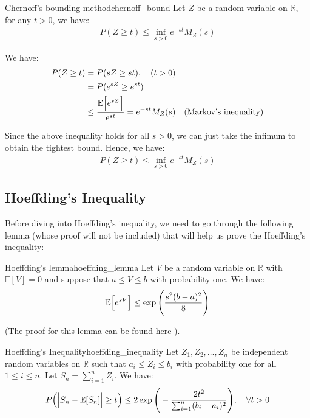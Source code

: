\begin{corollary}{Chernoff's bounding method}{chernoff_bound}
    Let $Z$ be a random variable on $\mathbb{R}$, for any $t>0$, we have:
    \begin{align*}
        P(Z\ge t) \le \inf_{s>0} e^{-st}M_Z(s)
    \end{align*}
\end{corollary}

\begin{proof*}
    We have:
    \begin{align*}
        P(Z \ge t) &= P(sZ \ge st), \ \ \ (t > 0) \\
            &= P(e^{sZ} \ge e^{st}) \\
            &\le \frac{\mathbb{E}\Big[ e^{sZ} \Big]}{e^{st}} = e^{-st}M_Z(s) \ \ \ (\text{Markov's inequality})
    \end{align*}

    \noindent Since the above inequality holds for all $s>0$, we can just take the infimum to obtain the tightest bound. Hence, we have:
    \begin{align*}
        P(Z \ge t) \le \inf_{s>0}e^{-st}M_Z(s)
    \end{align*}
\end{proof*}

\subsection{Hoeffding's Inequality}
Before diving into Hoeffding's inequality, we need to go through the following lemma (whose proof will not be included) that will help us prove the Hoeffding's inequality:
\begin{lemma}{Hoeffding's lemma}{hoeffding_lemma}
    Let $V$ be a random variable on $\mathbb{R}$ with $\mathbb{E}[V]=0$ and suppose that $a\le V \le b$ with probability one. We have:
    \begin{align*}
        \mathbb{E}\Big[ e^{sV} \Big] \le \exp\Bigg( 
        \frac{s^2(b-a)^2}{8}
         \Bigg)
    \end{align*}
\end{lemma}
\begin{proof*}
    (The proof for this lemma can be found here \cite{wiki:hoeffding_lemma}).
\end{proof*}

\begin{theorem}{Hoeffding's Inequality}{hoeffding_inequality}
    Let $Z_1, Z_2, \dots, Z_n$ be independent random variables on $\mathbb{R}$ such that $a_i \le Z_i \le b_i$ with probability one for all $1\le i \le n$. Let $S_n = \sum_{i=1}^n Z_i$. We have:
    \begin{align*}
        P\Big(  \Big|  S_n - \mathbb{E}[S_n]  \Big| \ge t  \Big) \le 2\exp\Bigg( 
        -\frac{2t^2}{\sum_{i=1}^n (b_i-a_i)^2}
         \Bigg), \ \ \ \forall t > 0
    \end{align*}
\end{theorem}

